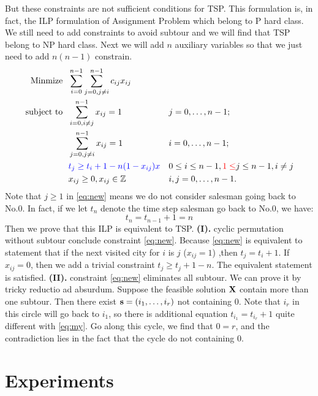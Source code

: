 \documentclass{mcmthesis}
\begin{document}
But these constraints are not sufficient conditions for TSP. This formulation is, in fact, the ILP formulation of Assignment Problem which belong to P hard class. We still need to add constraints to avoid subtour and we will find that TSP belong to NP hard   class. Next we will add $n$ auxiliary variables so that we just need to add $n(n-1)$ constrain. 
\begin{align}
	\mathop{\mathrm{Minmize \ \  }}       & \sum _{i=0}^{n-1}\sum _{j=0,j\neq i}^{n-1}c_{ij}x_{ij} &  & \notag                     \\
	\mathop{\mathrm{subject \  to \ \  }} & \sum _{i=0,i\neq j}^{n-1}x_{ij}=1                    &  & j=0,\ldots ,n-1;  \notag     \\
	                                      & \sum _{j=0,j\neq i}^{n-1}x_{ij}=1                    &  & i=0,\ldots ,n-1;      \notag \\
	                                      & \color{Blue} t_{j} \ge t_{i}+1-n(1-x_{ij})x  &  & 0\leq i\leq n-1, {\color{Red}1 \le} j \le n-1, i \neq j   \label{eq:new}     \\
	                                      & x_{ij} \geq 0, x_{ij} \in \Zbb                     &  & i,j=0,\ldots ,n-1. \notag
\end{align}
Note that $j \ge 1 $ in \eqref{eq:new} means we do not consider salesman going back to No.0. In fact, if we let $t_{n}$ denote the time step salesman go back to No.0, we have:
\begin{equation}\label{eq:my}
t_{n}=t_{n-1}+1=n 
\end{equation}
 Then we prove that this ILP is equivalent to TSP. \quad \textbf{(I).} cyclic permutation without subtour conclude constraint \eqref{eq:new}. Because \eqref{eq:new} is equivalent to statement that   if the next visited city for $i$ is $j$ ($x_{ij}=1$) ,then $t_j=t_i+1$. If $x_{ij}=0$, then we add a trivial constraint $t_j \ge t_j +1-n$.  The equivalent statement is satisfied.  \quad \textbf{(II).} constraint \eqref{eq:new} eliminates all subtour. We can prove it by tricky reductio ad absurdum. Suppose the feasible solution $\mathbf{X}$ contain more than one subtour. Then there exist $\mathbf{s}=(i_1,\dots,i_r)$ not containing 0. Note that $i_r$ in this circle will go back to $i_1$, so there is additional equation $t_{i_1}=t_{i_r}+1$  quite different with \eqref{eq:my}. Go along this cycle, we find that $0=r$, and the contradiction lies in the fact that the cycle do not containing 0.

\section{Experiments}
\end{document}
